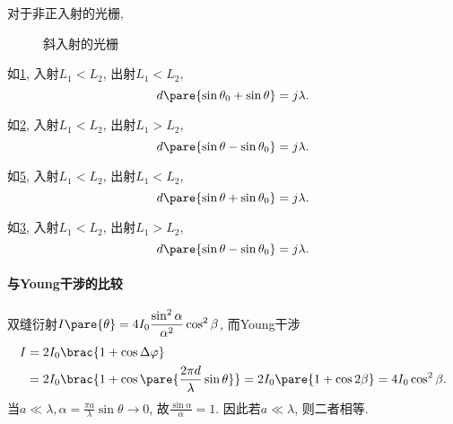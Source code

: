 \documentclass{ctexart}
\begin{document}
对于非正入射的光栅,
\begin{figure}[htbp]
    \centering
    \begin{subfigure}{5cm}
        \centering
        \caption{}
        \label{fig:斜入射的光栅1}
    \end{subfigure}
    \begin{subfigure}{5cm}
        \centering
        \caption{}
        \label{fig:斜入射的光栅2}
    \end{subfigure}
    \begin{subfigure}{5cm}
        \centering
        \caption{}
        \label{fig:斜入射的反射光栅1}
    \end{subfigure}
    \begin{subfigure}{5cm}
        \centering
        \caption{}
        \label{fig:斜入射的反射光栅2}
    \end{subfigure}
    \caption{斜入射的光栅}
\end{figure}
\begin{cenum}
    \item 如\cref{fig:斜入射的光栅1}, 入射$L_1 < L_2$, 出射$L_1 < L_2$,
    \[ d\pare{\sin\theta_0 + \sin\theta} = j\lambda. \]
    \item 如\cref{fig:斜入射的光栅2}, 入射$L_1 < L_2$, 出射$L_1 > L_2$,
    \[ d\pare{\sin\theta - \sin\theta_0} = j\lambda. \]
    \item 如\cref{fig:斜入射的反射光栅2}, 入射$L_1 < L_2$, 出射$L_1 < L_2$,
    \[ d\pare{\sin\theta + \sin\theta_0} = j\lambda. \]
    \item 如\cref{fig:斜入射的反射光栅1}, 入射$L_1 < L_2$, 出射$L_1 > L_2$,
    \[ d\pare{\sin\theta - \sin\theta_0} = j\lambda. \]
\end{cenum}


\paragraph{与Young干涉的比较} %
\label{par:与young干涉的比较}

双缝衍射$I\pare{\theta} = \displaystyle 4I_0 \frac{\sin^2\alpha}{\alpha^2}\cos^2\beta$, 而Young干涉
\begin{align*}
    I &= 2I_0 \brac{1+\cos\Delta\varphi} \\ &= 2I_0\brac{1+\cos\pare{\frac{2\pi d}{\lambda}\sin\theta}} = 2I_0\pare{1+\cos2\beta} = 4I_0\cos^2\beta.
\end{align*}
当$a\ll \lambda, \alpha = \displaystyle \frac{\pi a}{\lambda}\sin\theta \rightarrow 0$, 故$\displaystyle \frac{\sin\alpha}{\alpha} = 1$. 因此若$a\ll \lambda$, 则二者相等.
\end{document}
